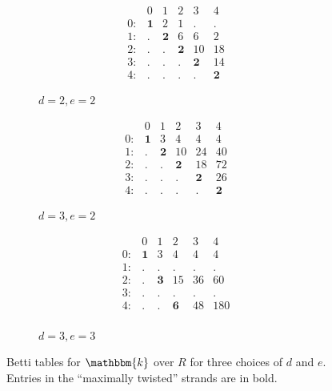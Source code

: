 \documentclass[12pt,reqno]{amsart}
\theoremstyle{definition}
\theoremstyle{remark}
\newcommand{\bbk}{\mathbbm{k}}
\begin{document}
\begin{figure}
\centering
\begin{subfigure}{.33\textwidth}
  \centering

\[\begin{matrix}
 & 0 & 1 & 2 & 3 & 4\\
0: & \mathbf 1 & 2 & 1 & . & .\\
1: & . & \mathbf 2 & 6 & 6 & 2\\
2: & . & . & \mathbf 2 & 10 & 18\\
3: & . & . & . & \mathbf 2 & 14\\
4: & . & . & . & . & \mathbf 2
\end{matrix}\]

\caption{$d=2,e=2$}
\end{subfigure}%
\begin{subfigure}{.33\textwidth}
  \centering

\[
\begin{matrix}
 & 0 & 1 & 2 & 3 & 4\\
0: & \mathbf 1 & 3 & 4 & 4 & 4\\
1: & . & \mathbf 2 & 10 & 24 & 40\\
2: & . & . & \mathbf 2 & 18 & 72\\
3: & . & . & . & \mathbf 2 & 26\\
4: & . & . & . & . & \mathbf 2
\end{matrix}
\]

\caption{$d=3,e=2$}
\end{subfigure}%
\begin{subfigure}{.33\textwidth}
  \centering

\[
\begin{matrix}
 & 0 & 1 & 2 & 3 & 4\\
0: & \mathbf 1 & 3 & 4 & 4 & 4\\
1: & . & . & . & . & .\\
2: & . & \mathbf 3 & 15 & 36 & 60\\
3: & . & . & . & . & .\\
4: & . & . & \mathbf 6 & 48 & 180\\
\end{matrix}
\]


\caption{$d=3,e=3$}
\end{subfigure}%
\caption{Betti tables for $\bbk$ over $R$ for three choices of $d$ and $e$. Entries in the ``maximally twisted'' strands are in bold.}
\label{fig:kBettiNumbers}
\end{figure}
\end{document}

